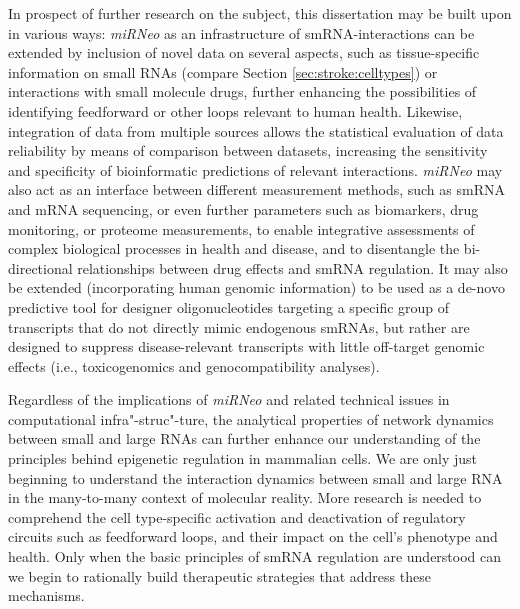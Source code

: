 In prospect of further research on the subject, this dissertation may be built upon in various ways: \emph{miRNeo} as an infrastructure of smRNA-interactions can be extended by inclusion of novel data on several aspects, such as tissue-specific information on small RNAs (compare Section \ref{sec:stroke:celltypes}) or interactions with small molecule drugs, further enhancing the possibilities of identifying feedforward or other loops relevant to human health. Likewise, integration of data from multiple sources allows the statistical evaluation of data reliability by means of comparison between datasets, increasing the sensitivity and specificity of bioinformatic predictions of relevant interactions. \emph{miRNeo} may also act as an interface between different measurement methods, such as smRNA and mRNA sequencing, or even further parameters such as biomarkers, drug monitoring, or proteome measurements, to enable integrative assessments of complex biological processes in health and disease, and to disentangle the bi-directional relationships between drug effects and smRNA regulation. It may also be extended (incorporating human genomic information) to be used as a de-novo predictive tool for designer oligonucleotides targeting a specific group of transcripts that do not directly mimic endogenous smRNAs, but rather are designed to suppress disease-relevant transcripts with little off-target genomic effects (i.e., toxicogenomics and genocompatibility analyses).

Regardless of the implications of \emph{miRNeo} and related technical issues in computational infra"-struc"-ture, the analytical properties of network dynamics between small and large RNAs can further enhance our understanding of the principles behind epigenetic regulation in mammalian cells. We are only just beginning to understand the interaction dynamics between small and large RNA in the many-to-many context of molecular reality. More research is needed to comprehend the cell type-specific activation and deactivation of regulatory circuits such as feedforward loops, and their impact on the cell's phenotype and health. Only when the basic principles of smRNA regulation are understood can we begin to rationally build therapeutic strategies that address these mechanisms. 